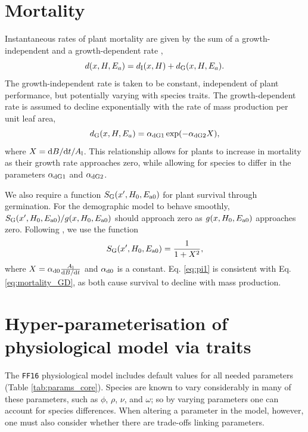 \documentclass[10pt,twoside]{article}
\begin{document}
\section{Mortality}\label{mortality}

Instantaneous rates of plant mortality are given by the sum of a growth-independent and a growth-dependent rate
\citep{Falster-2011, Moorcroft-2001},
\begin{equation}\label{eq:mortality}
d(x, H, E_{a}) = d_{{\rm I}}(x, H) + d_{{\rm G}}(x, H, E_{a}).
\end{equation}
The growth-independent rate is taken to be constant, independent of
plant performance, but potentially varying with species traits. The
growth-dependent rate is assumed to decline exponentially with the rate
of mass production per unit leaf area,
\begin{equation}\label{eq:mortality_GD}
d_{{\rm G}}(x, H, E_{a}) = \alpha_{{\rm dG1}} \exp(-\alpha_{{\rm dG2}} X),
\end{equation}
where \(X = {\rm d}B/{\rm d}t / A_{\rm l}\). This
relationship allows for plants to increase in mortality as their growth rate
approaches zero, while allowing for species to differ in
the parameters \(\alpha_{{\rm dG1}}\) and \(\alpha_{{\rm dG2}}\).

We also require a function \(S_{\rm G}  (x^\prime, H_0, E_{{\rm a}0})\) for plant survival
through germination. For the demographic model to behave smoothly,
\(S_{\rm G}  (x^\prime, H_0, E_{{\rm a}0}) / g(x, H_0, E_{{\rm a}0})\) should approach zero as
\(g(x, H_0, E_{{\rm a}0})\) approaches zero. Following \citet{Falster-2011},
we use the function
\begin{equation} \label{eq:pi1}
S_{\rm G} (x^\prime, H_0, E_{{\rm a}0}) = \frac1{1 + X^2},
\end{equation}
where $X = \alpha_{{\rm d0}} \frac{A_{\rm l}}{{\rm d}B / {\rm d}t}$ and $\alpha_{{\rm d0}}$ is a
constant. Eq. \ref{eq:pi1} is consistent with Eq.
\ref{eq:mortality_GD}, as both cause survival to decline with mass production.

\section{Hyper-parameterisation of physiological model via
traits}\label{traits}

The \texttt{FF16} physiological model includes default values for all needed parameters
(Table \ref{tab:params_core}). Species are known to vary considerably
in many of these parameters, such as $\phi$, $\rho$, $\nu$, and $\omega$; so by varying parameters
one can account for species differences. When altering a parameter in the model, however,
one must also consider whether there are trade-offs linking parameters.
\end{document}

